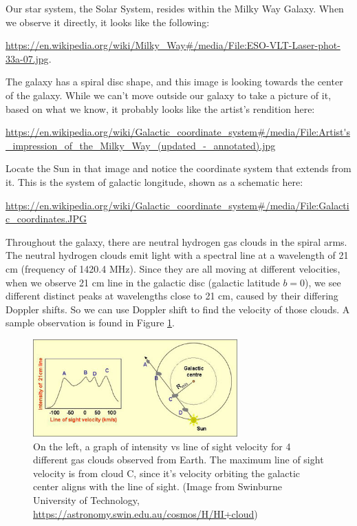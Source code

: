 Our star system, the Solar System, resides within the Milky Way Galaxy. When we observe it directly, it looks like the following:
\begin{framed}
	\url{https://en.wikipedia.org/wiki/Milky_Way#/media/File:ESO-VLT-Laser-phot-33a-07.jpg}.
\end{framed}	
The galaxy has a spiral disc shape, and this image is looking towards the center of the galaxy. While we can't move outside our galaxy to take a picture of it, based on what we know, it probably looks like the artist's rendition here:
\begin{framed}
	\url{https://en.wikipedia.org/wiki/Galactic_coordinate_system#/media/File:Artist's_impression_of_the_Milky_Way_(updated_-_annotated).jpg}
\end{framed}
Locate the Sun in that image and notice the coordinate system that extends from it. This is the system of galactic longitude, shown as a schematic here:
\begin{framed}
	\url{https://en.wikipedia.org/wiki/Galactic_coordinate_system#/media/File:Galactic_coordinates.JPG}
\end{framed}
Throughout the galaxy, there are neutral hydrogen gas clouds in the spiral arms. The neutral hydrogen clouds emit light with a spectral line at a wavelength of 21 cm (frequency of 1420.4 MHz). Since they are all moving at different velocities, when we observe 21 cm line in the galactic disc (galactic latitude $b=0$), we see different distinct peaks at wavelengths close to 21 cm, caused by their differing Doppler shifts. So we can use Doppler shift to find the velocity of those clouds. A sample observation is found in Figure \ref{sgr:fig:hicloud1}.

\begin{figure}
	\centering
	\includegraphics[width = 0.7\textwidth]{srt-galaxy-rotation/hicloud1}
	\caption{On the left, a graph of intensity vs line of sight velocity for 4 different gas clouds observed from Earth. The maximum line of sight velocity is from cloud C, since it's velocity orbiting the galactic center aligns with the line of sight. (Image from Swinburne University of Technology, \url{https://astronomy.swin.edu.au/cosmos/H/HI+cloud})}\label{sgr:fig:hicloud1}
\end{figure}

